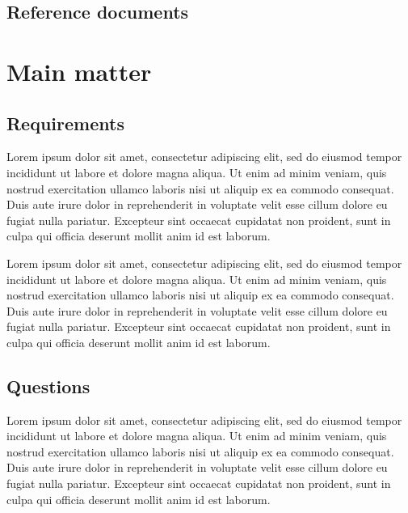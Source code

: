 \documentclass[12pt,a4paper]{article}
\begin{document}
\subsection{Reference documents}
\begin{RDlist}
\end{RDlist}



\section{Main matter}

\subsection{Requirements}
Lorem ipsum dolor sit amet, consectetur adipiscing elit, sed do eiusmod tempor incididunt ut labore et dolore magna aliqua. Ut enim ad minim veniam, quis nostrud exercitation ullamco laboris nisi ut aliquip ex ea commodo consequat. Duis aute irure dolor in reprehenderit in voluptate velit esse cillum dolore eu fugiat nulla pariatur. Excepteur sint occaecat cupidatat non proident, sunt in culpa qui officia deserunt mollit anim id est laborum.

Lorem ipsum dolor sit amet, consectetur adipiscing elit, sed do eiusmod tempor incididunt ut labore et dolore magna aliqua. Ut enim ad minim veniam, quis nostrud exercitation ullamco laboris nisi ut aliquip ex ea commodo consequat. Duis aute irure dolor in reprehenderit in voluptate velit esse cillum dolore eu fugiat nulla pariatur. Excepteur sint occaecat cupidatat non proident, sunt in culpa qui officia deserunt mollit anim id est laborum.


\subsection{Questions}

Lorem ipsum dolor sit amet, consectetur adipiscing elit, sed do eiusmod tempor incididunt ut labore et dolore magna aliqua. Ut enim ad minim veniam, quis nostrud exercitation ullamco laboris nisi ut aliquip ex ea commodo consequat. Duis aute irure dolor in reprehenderit in voluptate velit esse cillum dolore eu fugiat nulla pariatur. Excepteur sint occaecat cupidatat non proident, sunt in culpa qui officia deserunt mollit anim id est laborum.
\end{document}
